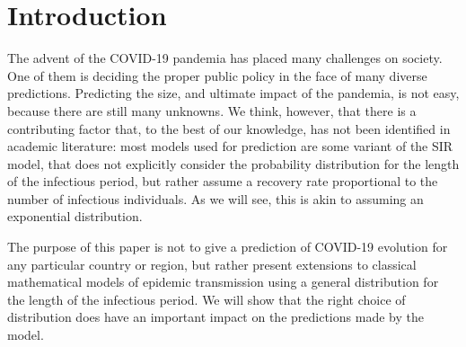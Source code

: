 \documentclass[USenglish,10pt]{article}
\begin{document}
\section{Introduction}\label{intro}


The advent of the COVID-19 pandemia has placed many challenges on society.
One of them is deciding the proper public policy in the face of many diverse predictions.
Predicting the size, and ultimate impact of the pandemia, is not easy, because there are still many unknowns.
We think, however, that there is a contributing factor that, to the best of our knowledge, has not been identified in academic literature: most models used for prediction are some variant of the SIR model, that does not explicitly consider the probability distribution for the length of the infectious period, but rather assume a recovery rate proportional to the number of infectious individuals. As we will see, this is akin to assuming an exponential distribution.

The purpose of this paper is not to give a prediction of COVID-19 evolution for any particular country or region, but rather present extensions to classical mathematical models of epidemic transmission using a general distribution for the length of the infectious period. We will  show that the right choice of distribution does have an important impact on the predictions made by the model.
\end{document}

